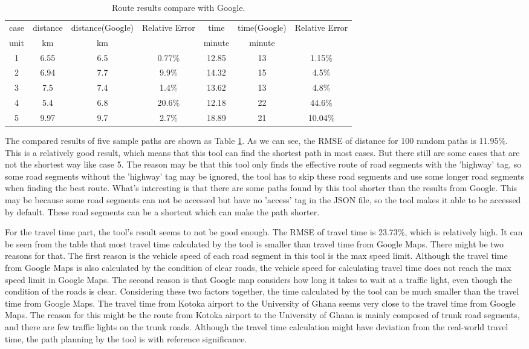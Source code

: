 \documentclass[final-report]{report-template}
\begin{document}
\begin{table}[H]
    \centering
    \begin{tabular}{|c|c|c|c|c|c|c|}
    \hline
   case & distance & distance(Google) & Relative Error & time & time(Google) & Relative Error\\
   unit & km & km &  & minute & minute &   \\
    \hline
    1 & 6.55 & 6.5 & 0.77\% & 12.85 & 13 & 1.15\% \\
    2 & 6.94 & 7.7 & 9.9\% & 14.32 & 15 & 4.5\% \\
    3 & 7.5 & 7.4 & 1.4\% & 13.62 & 13 & 4.8\% \\
    4 & 5.4 & 6.8 & 20.6\% & 12.18 & 22 & 44.6\% \\
    5 & 9.97 & 9.7 & 2.7\% & 18.89 & 21 & 10.04\% \\
    \hline
    \end{tabular}
    \caption{\label{tab:route_results}Route results compare with Google.}
\end{table}
The compared results of five sample paths are shown as Table \ref{tab:route_results}. 
As we can see, the RMSE of distance for 100 random paths is 11.95\%. 
This is a relatively good result, which means that this tool can find the shortest path in most cases.
But there still are some cases that are not the shortest way like case 5.
The reason may be that this tool only finds the effective route of road segments with the 'highway' tag,
so some road segments without the 'highway' tag may be ignored,
the tool has to skip these road segments and use some longer road segments when finding the best route.
What's interesting is that there are some paths found by this tool shorter than the results from Google.
This may be because some road segments can not be accessed but have no 'access' tag in the JSON file, 
so the tool makes it able to be accessed by default. These road segments can be a shortcut which can make the path shorter.

For the travel time part, the tool's result seems to not be good enough.
The RMSE of travel time is 23.73\%, which is relatively high. 
It can be seen from the table that most travel time calculated by the tool is smaller than travel time from Google Maps.
There might be two reasons for that. 
The first reason is the vehicle speed of each road segment in this tool is the max speed limit. 
Although the travel time from Google Maps is also calculated by the condition of clear roads, 
the vehicle speed for calculating travel time does not reach the max speed limit in Google Maps.
The second reason is that Google map considers how long it takes to wait at a traffic light, 
even though the condition of the roads is clear.
Considering these two factors together, the time calculated by the tool can be much smaller than the travel time from Google Maps.
The travel time from Kotoka airport to the University of Ghana seems very close to the travel time from Google Maps. 
The reason for this might be the route from Kotoka airport to the University of Ghana is mainly composed of trunk road segments,
and there are few traffic lights on the trunk roads.
Although the travel time calculation might have deviation from the real-world travel time, 
the path planning by the tool is with reference significance.
\end{document}
